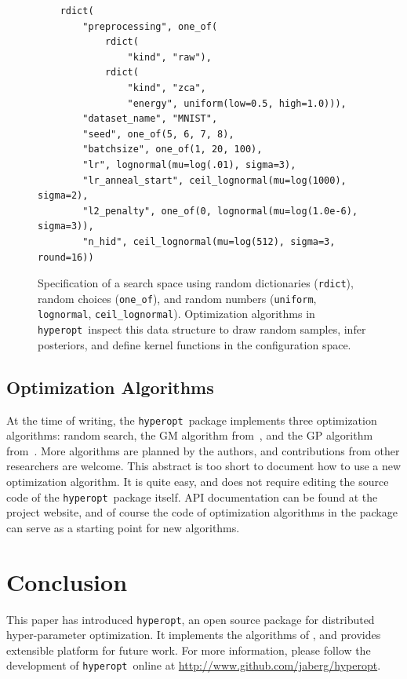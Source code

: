\documentclass{article}
\newcommand{\hyperopt}{{\tt hyperopt}}
\begin{document}
\begin{figure}
\begin{minipage}{\textwidth}
\small
\begin{verbatim}
    rdict(
        "preprocessing", one_of(
            rdict(
                "kind", "raw"),
            rdict(
                "kind", "zca",
                "energy", uniform(low=0.5, high=1.0))),
        "dataset_name", "MNIST",
        "seed", one_of(5, 6, 7, 8),
        "batchsize", one_of(1, 20, 100),
        "lr", lognormal(mu=log(.01), sigma=3),
        "lr_anneal_start", ceil_lognormal(mu=log(1000), sigma=2),
        "l2_penalty", one_of(0, lognormal(mu=log(1.0e-6), sigma=3)),
        "n_hid", ceil_lognormal(mu=log(512), sigma=3, round=16))
\end{verbatim}
\end{minipage}
\caption{Specification of a search space using random dictionaries
({\tt \small rdict}), random choices ({\tt \small one\_of}), and random numbers ({\tt \small uniform},
{\tt \small lognormal}, {\tt \small ceil\_lognormal}).
Optimization algorithms in \hyperopt\ inspect this data structure to
draw random samples, infer posteriors, and define kernel functions in the configuration space.
}
\label{f:htdict}
\end{figure}

\subsection{Optimization Algorithms}

At the time of writing, the \hyperopt\ package
implements three optimization algorithms:
random search,
the GM algorithm from~\cite{bergstra+bardenet+bengio+kegl:2011},
and the GP algorithm from~\cite{bergstra+bardenet+bengio+kegl:2011}.
More algorithms are planned by the authors,
and contributions from other researchers are welcome.
This abstract is too short to document how to use a new optimization algorithm.
It is quite easy, and does not require editing the source code of the
\hyperopt\ package itself.  API documentation can be found at the project
website, and of course the code of optimization algorithms in the package can
serve as a starting point for new algorithms.

\section{Conclusion}
This paper has introduced \hyperopt, an open source package for
distributed hyper-parameter
optimization. It implements the algorithms of \cite{bergstra+bardenet+bengio+kegl:2011},
and provides extensible platform for future work.
For more information, please follow the development of \hyperopt\ online at
\url{http://www.github.com/jaberg/hyperopt}.

\newpage
\small


\end{document}
